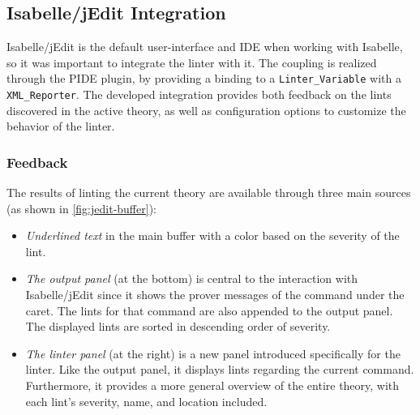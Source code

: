 \subsection{Isabelle/jEdit Integration}\label{subsection:integration-jedit}
Isabelle/jEdit is the default user-interface and IDE when working with
Isabelle, so it was important to integrate the linter with it.
The coupling is realized through the PIDE plugin, by providing a
binding to a \texttt{Linter\_Variable} with a \texttt{XML\_Reporter}. 
The developed integration provides both feedback on the lints
discovered in the active theory, as well as configuration options to
customize the behavior of the linter.

\subsubsection{Feedback}
The results of linting the current theory are available 
through three main sources (as shown in \autoref{fig:jedit-buffer}):
\begin{itemize}
    \item \textit{Underlined text} in the main buffer with
    a color based on the severity of the lint.
    \item \textit{The output panel} (at the bottom)
    is central to the interaction with Isabelle/jEdit since it shows 
    the prover messages of the command under the caret. 
    The lints for that command are also appended to the output panel.
    The displayed 
    lints are sorted in descending order of severity.
    \item \textit{The linter panel} (at the right) 
    is a new panel introduced specifically for the linter. Like
    the output panel, it displays lints regarding the
    current command. Furthermore, it provides a more general
    overview of the entire theory, with each lint's severity, name, and
    location included.
\end{itemize}

